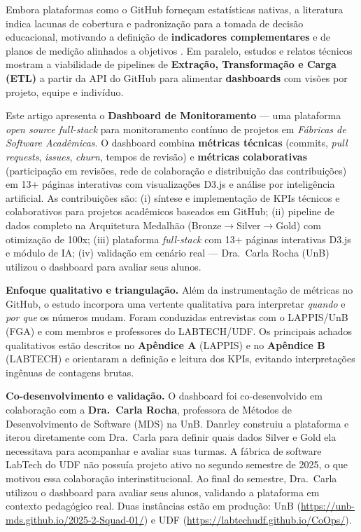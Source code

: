 \documentclass[
	12pt,
	openright,
	oneside,
	a4paper,
	brazil
]{abntex2}
\begin{document}
Embora plataformas como o GitHub forneçam estatísticas nativas, a literatura indica lacunas de cobertura e padronização para a tomada de decisão educacional, motivando a definição de \textbf{indicadores complementares} e de planos de medição alinhados a objetivos \cite{barbosaIndicadoresConjunto2016,kitchenham2010s}. Em paralelo, estudos e relatos técnicos mostram a viabilidade de pipelines de \textbf{Extração, Transformação e Carga (ETL)} a partir da API do GitHub para alimentar \textbf{dashboards} com visões por projeto, equipe e indivíduo.

Este artigo apresenta o \textbf{Dashboard de Monitoramento} --- uma plataforma \textit{open source full-stack} para monitoramento contínuo de projetos em \textit{Fábricas de Software Acadêmicas}. O dashboard combina \textbf{métricas técnicas} (commits, \textit{pull requests}, \textit{issues}, \textit{churn}, tempos de revisão) e \textbf{métricas colaborativas} (participação em revisões, rede de colaboração e distribuição das contribuições) em 13+ páginas interativas com visualizações D3.js e análise por inteligência artificial. As contribuições são: (i) síntese e implementação de KPIs técnicos e colaborativos para projetos acadêmicos baseados em GitHub; (ii) pipeline de dados completo na Arquitetura Medalhão (Bronze$\rightarrow$Silver$\rightarrow$Gold) com otimização de 100x; (iii) plataforma \textit{full-stack} com 13+ páginas interativas D3.js e módulo de IA; (iv) validação em cenário real --- Dra.\ Carla Rocha (UnB) utilizou o dashboard para avaliar seus alunos.

\noindent
\textbf{Enfoque qualitativo e triangulação.} Além da instrumentação de métricas no GitHub, o estudo incorpora uma vertente qualitativa para interpretar \emph{quando} e \emph{por que} os números mudam. Foram conduzidas entrevistas com o LAPPIS/UnB (FGA) e com membros e professores do LABTECH/UDF. Os principais achados qualitativos estão descritos no \textbf{Apêndice A} (LAPPIS) e no \textbf{Apêndice B} (LABTECH) e orientaram a definição e leitura dos KPIs, evitando interpretações ingênuas de contagens brutas.

\noindent
\textbf{Co-desenvolvimento e validação.} O dashboard foi co-desenvolvido em colaboração com a \textbf{Dra.\ Carla Rocha}, professora de Métodos de Desenvolvimento de Software (MDS) na UnB. Danrley construiu a plataforma e iterou diretamente com Dra.\ Carla para definir quais dados Silver e Gold ela necessitava para acompanhar e avaliar suas turmas. A fábrica de software LabTech do UDF não possuía projeto ativo no segundo semestre de 2025, o que motivou essa colaboração interinstitucional. Ao final do semestre, Dra.\ Carla utilizou o dashboard para avaliar seus alunos, validando a plataforma em contexto pedagógico real. Duas instâncias estão em produção: UnB (\url{https://unb-mds.github.io/2025-2-Squad-01/}) e UDF (\url{https://labtechudf.github.io/CoOps/}).
\end{document}
